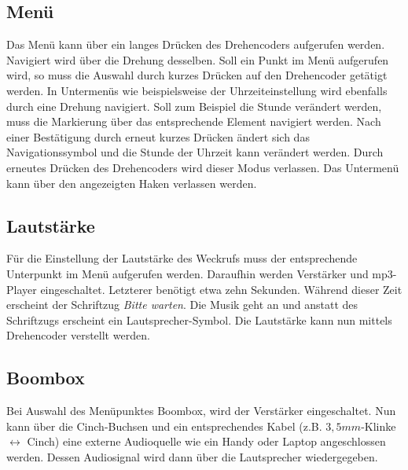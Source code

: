 \documentclass[journal, a4paper]{IEEEtran}
\begin{document}
\subsection{Menü}
Das Menü kann über ein langes Drücken des Drehencoders aufgerufen werden. Navigiert wird über die Drehung desselben. Soll ein Punkt im Menü aufgerufen wird, so muss die Auswahl durch kurzes Drücken auf den Drehencoder getätigt werden. In Untermenüs wie beispielsweise der Uhrzeiteinstellung wird ebenfalls durch eine Drehung navigiert. Soll zum Beispiel die Stunde verändert werden, muss die Markierung über das entsprechende Element navigiert werden. Nach einer Bestätigung durch erneut kurzes Drücken ändert sich das Navigationssymbol und die Stunde der Uhrzeit kann verändert werden. Durch erneutes Drücken des Drehencoders wird dieser Modus verlassen. Das Untermenü kann über den angezeigten Haken verlassen werden.
\subsection{Lautstärke}
Für die Einstellung der Lautstärke des Weckrufs muss der entsprechende Unterpunkt im Menü aufgerufen werden. Daraufhin werden Verstärker und mp3-Player eingeschaltet. Letzterer benötigt etwa zehn Sekunden. Während dieser Zeit erscheint der Schriftzug \emph{\glqq Bitte warten\grqq}. Die Musik geht an und anstatt des Schriftzugs erscheint ein Lautsprecher-Symbol. Die Lautstärke kann nun mittels Drehencoder verstellt werden.
\subsection{Boombox}
Bei Auswahl des Menüpunktes Boombox, wird der Verstärker eingeschaltet. Nun kann über die Cinch-Buchsen und ein entsprechendes Kabel (z.B. $3,5mm$-Klinke $\leftrightarrow$ Cinch) eine externe Audioquelle wie ein Handy oder Laptop angeschlossen werden. Dessen Audiosignal wird dann über die Lautsprecher wiedergegeben.
	
\end{document}
